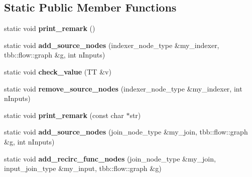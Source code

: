 \subsection*{Static Public Member Functions}
\begin{DoxyCompactItemize}
\item 
\hypertarget{classsource__node__helper_acd485a15168012021c5f1eae898773dd}{}static void {\bfseries print\+\_\+remark} ()\label{classsource__node__helper_acd485a15168012021c5f1eae898773dd}

\item 
\hypertarget{classsource__node__helper_a9bdc75b7ce56fbd971f97ba228b8ebc9}{}static void {\bfseries add\+\_\+source\+\_\+nodes} (indexer\+\_\+node\+\_\+type \&my\+\_\+indexer, tbb\+::flow\+::graph \&g, int n\+Inputs)\label{classsource__node__helper_a9bdc75b7ce56fbd971f97ba228b8ebc9}

\item 
\hypertarget{classsource__node__helper_aabe07bbbc68b7223358f10ed502da2d8}{}static void {\bfseries check\+\_\+value} (T\+T \&v)\label{classsource__node__helper_aabe07bbbc68b7223358f10ed502da2d8}

\item 
\hypertarget{classsource__node__helper_adc4fd75b8aa03d9ae48c3c805a1528bf}{}static void {\bfseries remove\+\_\+source\+\_\+nodes} (indexer\+\_\+node\+\_\+type \&my\+\_\+indexer, int n\+Inputs)\label{classsource__node__helper_adc4fd75b8aa03d9ae48c3c805a1528bf}

\item 
\hypertarget{classsource__node__helper_afd032162ee7d918997731c9740459f08}{}static void {\bfseries print\+\_\+remark} (const char $\ast$str)\label{classsource__node__helper_afd032162ee7d918997731c9740459f08}

\item 
\hypertarget{classsource__node__helper_a50577ffd0342530d74ce9f8f317cc22c}{}static void {\bfseries add\+\_\+source\+\_\+nodes} (join\+\_\+node\+\_\+type \&my\+\_\+join, tbb\+::flow\+::graph \&g, int n\+Inputs)\label{classsource__node__helper_a50577ffd0342530d74ce9f8f317cc22c}

\item 
\hypertarget{classsource__node__helper_ab4cd8f45b300296f99590d26873ae4f9}{}static void {\bfseries add\+\_\+recirc\+\_\+func\+\_\+nodes} (join\+\_\+node\+\_\+type \&my\+\_\+join, input\+\_\+join\+\_\+type \&my\+\_\+input, tbb\+::flow\+::graph \&g)\label{classsource__node__helper_ab4cd8f45b300296f99590d26873ae4f9}


\end{DoxyCompactItemize}
